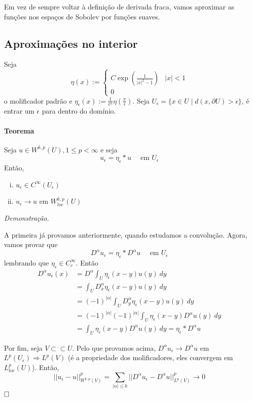 \documentclass[11pt]{article}
\newcommand{\qed}{$\hfill\square$}
\newcommand{\p}{\partial}
\newcommand{\e}{\epsilon}
\begin{document}
Em vez de sempre voltar à definição de derivada fraca, vamos aproximar as funções nos espaços de Sobolev por funções suaves.

\subsection{Aproximações no interior}

Seja \[ \eta(x):= \begin{cases}
	C \exp\left(\frac{1}{|x|^2-1}\right) & |x|<1\\
	0
\end{cases} \] o molificador padrão e \( \eta_\e(x):= \frac{1}{\e^n}\eta\left(\frac{x}{\e}\right) \). Seja \( U_\e = \{x \in U \mid d(x, \p U) > \e\} \), é entrar um \( \e \) para dentro do domínio.

\paragraph{Teorema} Seja \( u \in W^{k,p}(U), 1 \leq p < \infty \) e seja \[ u_\e = \eta_\e * u\quad  \text{ em } U_\e\] Então, \begin{enumerate}[(i)]
	\item \( u_\e \in C^\infty(U_\e) \)
	\item \( u_\e \rightarrow u \) em \( W^{k,p}_{loc}(U) \)
\end{enumerate}

\textit{Demonstração.}

A primeira já provamos anteriormente, quando estudamos a convolução. Agora, vamos provar que \[ D^\alpha u_\e = \eta_\e * D^\alpha u \quad \text{ em } U_\e\] lembrando que \( \eta_\e \in C^\infty_c \). Então \begin{align*}
	D^\alpha u_\e(x) &= D^\alpha \int_U \eta_\e(x-y) u(y)\ dy\\
	&=  \int_U D^\alpha_x \eta_\e(x-y) u(y)\ dy\\
	&=  (-1)^{|\alpha|} \int_U D^\alpha_y \eta_\e(x-y) u(y)\ dy\\
	&= (-1)^{|\alpha|}(-1)^{|\alpha|}  \int_U \eta_\e(x-y) D^\alpha u(y)\ dy\\
	&=  \int_U \eta_\e(x-y) D^\alpha u(y)\ dy = \eta_\e * D^\alpha u
\end{align*}

Por fim, seja \( V \subset\subset U \). Pelo que provamos acima, \( D^\alpha u_\e \rightarrow D^\alpha u \) em \( L^p(U_\e) \Rightarrow L^p(V) \) (é a propriedade dos molificadores, eles convergem em \( L^p_{loc}(U) \)). Então, \[ ||u_\e - u||^p_{W^{k,p}(V)} = \sum_{|\alpha|\leq k} ||D^\alpha u_\e - D^\alpha u||^p_{L^p(V)} \rightarrow 0\] \qed
\end{document}
